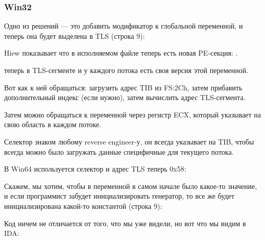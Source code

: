 \subsubsection{Win32}


Одно из решений --- это добавить модификатор  к глобальной переменной, 
и теперь она будет выделена в \ac{TLS} (строка 9):



Hiew показывает что в исполняемом файле теперь есть новая PE-секция: .



 теперь в \ac{TLS}-сегменте и у каждого потока есть своя версия этой переменной.

Вот как к ней обращаться: загрузить адрес \ac{TIB} из FS:2Ch, затем прибавить дополнительный индекс 
(если нужно), затем вычислить адрес \ac{TLS}-сегмента.

Затем можно обращаться к переменной  через регистр ECX, который указывает на свою
область в каждом потоке.

Селектор  знаком любому reverse engineer-у, он всегда указывает на \ac{TIB}, чтобы всегда можно было
загружать данные специфичные для текущего потока.

В Win64 используется селектор  и адрес \ac{TLS} теперь 0x58:




Скажем, мы хотим, чтобы в переменной  в самом начале было какое-то значение, 
и если программист забудет инициализировать генератор, то  все же будет инициализирована какой-то
константой (строка 9):



Код ничем не отличается от того, что мы уже видели, но вот что мы видим в IDA:



